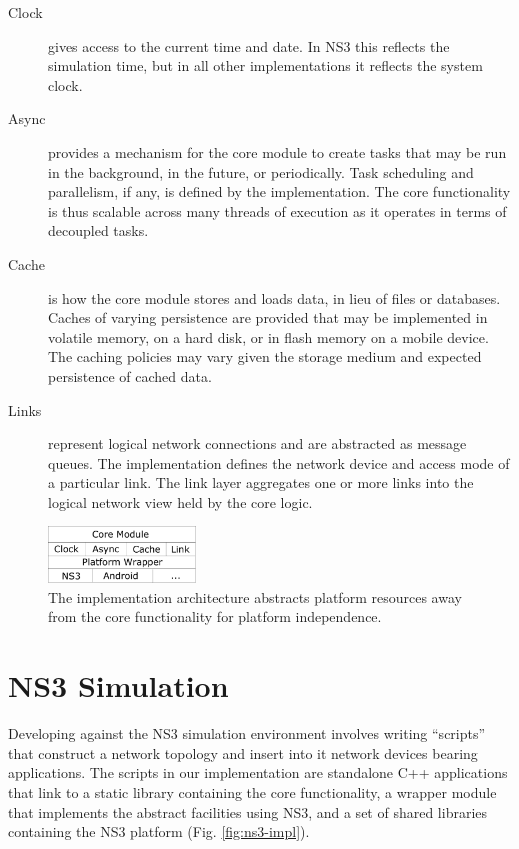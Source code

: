 \documentclass[10pt]{sig-alternate}
\begin{document}
\noindent
\begin{description}
\item[Clock] gives access to the current time and date. In NS3 this reflects the simulation time, but in all other implementations it reflects the system clock.
\item[Async] provides a mechanism for the core module to create tasks that may be run in the background, in the future, or periodically. Task scheduling and parallelism, if any, is defined by the implementation. The core functionality is thus scalable across many threads of execution as it operates in terms of decoupled tasks.
\item[Cache] is how the core module stores and loads data, in lieu of files or databases. Caches of varying persistence are provided that may be implemented in volatile memory, on a hard disk, or in flash memory on a mobile device. The caching policies may vary given the storage medium and expected persistence of cached data.
\item[Links] represent logical network connections and are abstracted as message queues. The implementation defines the network device and access mode of a particular link. The link layer aggregates one or more links into the logical network view held by the core logic.
\end{description}
\noindent

\begin{figure}[h]
  \begin{center}
    \includegraphics[width=0.35\textwidth]{android-platform-wrapper.pdf}
  \end{center}

  \caption{\small The implementation architecture abstracts platform resources away from the core functionality for platform independence.}
  \label{fig:android-platform-wrapper}
\end{figure}

\section{NS3 Simulation}

Developing against the NS3 simulation environment involves writing ``scripts'' that construct a network topology and insert into it network devices bearing applications. The scripts in our implementation are standalone C++ applications that link to a static library containing the core functionality, a wrapper module that implements the abstract facilities using NS3, and a set of shared libraries containing the NS3 platform (Fig. \ref{fig:ns3-impl}).
\end{document}

